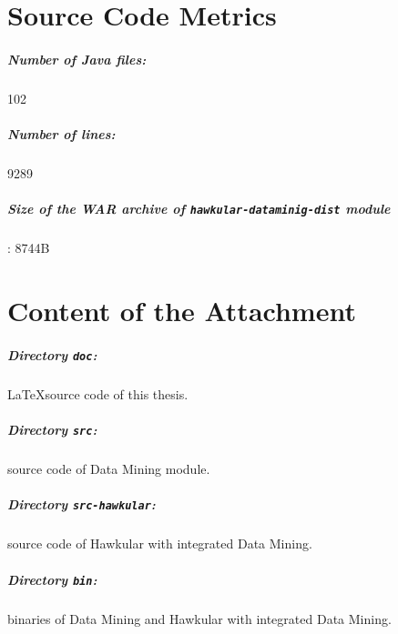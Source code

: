 \chapter{Source Code Metrics}
    \paragraph*{Number of Java files:} 102
    \paragraph*{Number of lines:} 9289
    \paragraph*{Size of the WAR archive of \texttt{hawkular-dataminig-dist} module} : 8744B

\chapter{Content of the Attachment}
    \paragraph*{Directory \texttt{doc}:} \LaTeX source code of this thesis.
    \paragraph*{Directory \texttt{src}:} source code of Data Mining module.
    \paragraph*{Directory \texttt{src-hawkular}:} source code of Hawkular with integrated Data Mining.
    \paragraph*{Directory \texttt{bin}:} binaries of Data Mining and Hawkular with integrated Data Mining.
